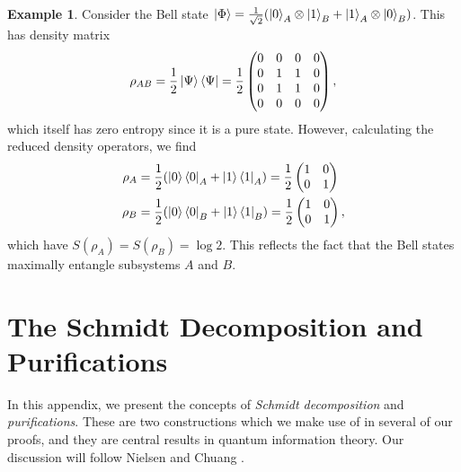 \documentclass[12pt,a4paper]{report}
\numberwithin{equation}{section}
\newcommand{\ketbra}[2]{\ket{#1}\bra{#2}}
\newcommand{\ketbras}[1]{\ketbra{#1}{#1}}
\theoremstyle{definition}
\theoremstyle{theorem}
\theoremstyle{theorem}
\theoremstyle{example}
\newtheorem{example}{Example}[section]
\theoremstyle{definition}
\begin{document}
\begin{example}
	Consider the Bell state $\ket{\Phi}=\frac{1}{\sqrt{2}}(\ket{0}_{A}\otimes\ket{1}_{B}+\ket{1}_{A}\otimes\ket{0}_{B})$. This has density matrix
	\begin{equation}
		\rho_{AB}=\frac{1}{2}\ketbras{\Psi}=\frac{1}{2}\begin{pmatrix}
			0&0&0&0\\0&1&1&0\\0&1&1&0\\0&0&0&0
		\end{pmatrix},
	\end{equation}
	which itself has zero entropy since it is a pure state. However, calculating the reduced density operators, we find
	\begin{equation}
			\begin{aligned}
			\rho_{A}&=\frac{1}{2}(\ketbras{0}_{A}+\ketbras{1}_{A})=\frac{1}{2}\begin{pmatrix}
				1&0\\0&1
			\end{pmatrix}\\\rho_{B}&=\frac{1}{2}(\ketbras{0}_{B}+\ketbras{1}_{B})=\frac{1}{2}\begin{pmatrix}
			1&0\\0&1
			\end{pmatrix},
		\end{aligned}
	\end{equation}
	 which have $S(\rho_{A})=S(\rho_{B})=\log{2}$. This reflects the fact that the Bell states maximally entangle subsystems $A$ and $B$.
\end{example}

\chapter{The Schmidt Decomposition and Purifications}\label{apc}
In this appendix, we present the concepts of \textit{Schmidt decomposition} and \textit{purifications}. These are two constructions which we make use of in several of our proofs, and they are central results in quantum information theory. Our discussion will follow Nielsen and Chuang \cite{NielsenChuang}.
\end{document}
